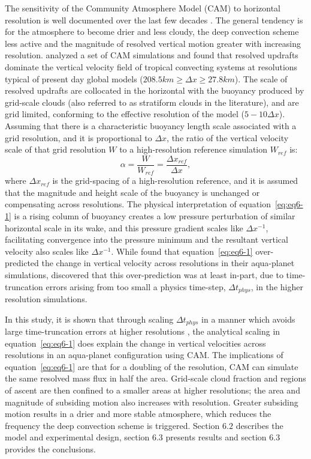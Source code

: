 The sensitivity of the Community Atmosphere Model (CAM) to horizontal resolution is well documented over the last few decades \citep{KW1991JGR,WETAL1995CD,W1999T,W2008TELLUS,LETAL2011TELLUS,RJ2011MWR,RETAL2012ASL,OETAL2013JCLIM,RETAL2013JCLIM,ZetAl2014JCb,LETAL2015JCLIM}. The general tendency is for the atmosphere to become drier and less cloudy, the deep convection scheme less active and the magnitude of resolved vertical motion greater with increasing resolution. \cite{HR2017JCLIM,HR2018JAMES} analyzed a set of CAM simulations and found that resolved updrafts dominate the vertical velocity field of tropical convecting systems at resolutions typical of present day global models ($208.5 km \geq \Delta x \geq 27.8 km$). The scale of resolved updrafts are collocated in the horizontal with the buoyancy produced by grid-scale clouds (also referred to as stratiform clouds in the literature), and are grid limited, conforming to the effective resolution of the model ($5-10\Delta x$). Assuming that there is a characteristic buoyancy length scale associated with a grid resolution, and it is proportional to $\Delta x$, the ratio of the vertical velocity scale of that grid resolution $W$ to a high-resolution reference simulation $W_{ref}$ is:
\begin{equation}
\alpha = \frac{W}{W_{ref}} = \frac{\Delta x_{ref}}{\Delta x} , \label{eq:eq6-1}
\end{equation}
where $\Delta x_{ref}$ is the grid-spacing of a high-resolution reference, and it is assumed that the magnitude and height scale of the buoyancy is unchanged or compensating across resolutions. The physical interpretation of equation~\ref{eq:eq6-1} is a rising column of buoyancy creates a low pressure perturbation of similar horizontal scale in its wake, and this pressure gradient scales like $\Delta x^{-1}$, facilitating convergence into the pressure minimum and the resultant vertical velocity also scales like $\Delta x^{-1}$. While \cite{HR2017JCLIM} found that equation~\ref{eq:eq6-1} over-predicted the change in vertical velocity across resolutions in their aqua-planet simulations, \cite{HR2017JCLIM} discovered that this over-prediction was at least in-part, due to time-truncation errors arising from too small a physics time-step, $\Delta t_{phys}$, in the higher resolution simulations.

In this study, it is shown that through scaling $\Delta t_{phys}$ in a manner which avoids large time-truncation errors at higher resolutions \citep[Appendix A][]{HETAL2019JAMES}, the analytical scaling in equation~\ref{eq:eq6-1} does explain the change in vertical velocities across resolutions in an aqua-planet configuration using CAM. The implications of equation~\ref{eq:eq6-1} are that for a doubling of the resolution, CAM can simulate the same resolved mass flux in half the area. Grid-scale cloud fraction and regions of ascent are then confined to a smaller areas at higher resolutions; the area and magnitude of subsiding motion also increases with resolution. Greater subsiding motion results in a drier and more stable atmosphere, which reduces the frequency the deep convection scheme is triggered. Section $6.2$ describes the model and experimental design, section 6.3 presents results and section 6.3 provides the conclusions.

